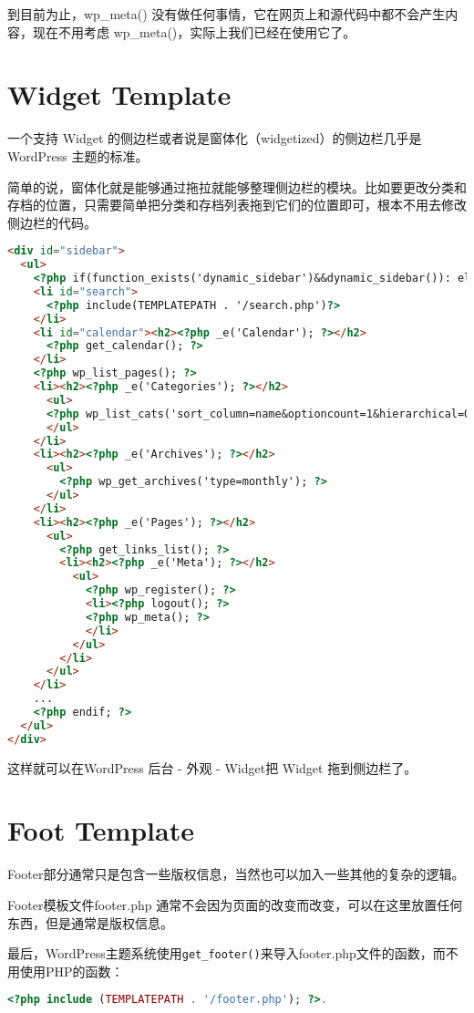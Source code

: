 到目前为止，wp\_meta() 没有做任何事情，它在网页上和源代码中都不会产生内容，现在不用考虑 wp\_meta()，实际上我们已经在使用它了。


\section{Widget Template}

一个支持 Widget 的侧边栏或者说是窗体化（widgetized）的侧边栏几乎是 WordPress 主题的标准。

简单的说，窗体化就是能够通过拖拉就能够整理侧边栏的模块。比如要更改分类和存档的位置，只需要简单把分类和存档列表拖到它们的位置即可，根本不用去修改侧边栏的代码。


\begin{lstlisting}[language=HTML]
<div id="sidebar">
  <ul>
    <?php if(function_exists('dynamic_sidebar')&&dynamic_sidebar()): else : ?>
    <li id="search">
      <?php include(TEMPLATEPATH . '/search.php')?>
    </li>
    <li id="calendar"><h2><?php _e('Calendar'); ?></h2>
      <?php get_calendar(); ?>
    </li>
    <?php wp_list_pages(); ?>
    <li><h2><?php _e('Categories'); ?></h2>
      <ul>
      <?php wp_list_cats('sort_column=name&optioncount=1&hierarchical=0'); ?>
      </ul>
    </li>
    <li><h2><?php _e('Archives'); ?></h2>
      <ul>
        <?php wp_get_archives('type=monthly'); ?>
      </ul>
    </li>
    <li><h2><?php _e('Pages'); ?></h2>
      <ul>
        <?php get_links_list(); ?>
        <li><h2><?php _e('Meta'); ?></h2>
          <ul>
            <?php wp_register(); ?>
            <li><?php logout(); ?>
            <?php wp_meta(); ?>
            </li>
          </ul>
        </li>
      </ul>
    </li>
    ...
    <?php endif; ?>
  </ul>
</div>
\end{lstlisting}

这样就可以在WordPress 后台 - 外观 - Widget把 Widget 拖到侧边栏了。

\section{Foot Template}

Footer部分通常只是包含一些版权信息，当然也可以加入一些其他的复杂的逻辑。

Footer模板文件footer.php 通常不会因为页面的改变而改变，可以在这里放置任何东西，但是通常是版权信息。

最后，WordPress主题系统使用\texttt{get\_footer()}来导入footer.php文件的函数，而不用使用PHP的函数：

\begin{lstlisting}[language=PHP]
<?php include (TEMPLATEPATH . '/footer.php'); ?>.
\end{lstlisting}









